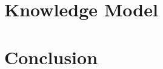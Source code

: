 \documentclass[preprint,12pt]{elsarticle}
\begin{document}
\section{Knowledge Model}
\label{Sect:Ontology}



\section{Conclusion}
\label{Sect:Conclusion}













\end{document}
